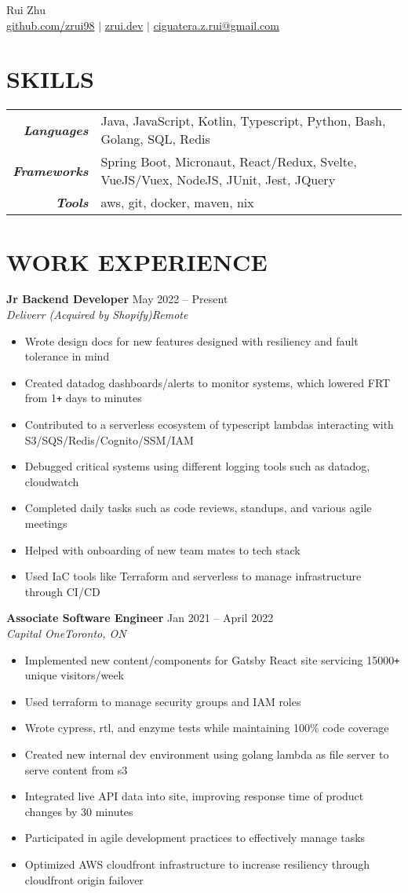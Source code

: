 \documentclass[letterpaper]{article}
\newcommand{\Header}[2]{\begin{center}
	\huge\usefont{OT1}{lmss}{m}{n}
		#1 \\
	\small{#2}
\end{center}}
\newcommand{\SplitEntry}[2]{\textbf{\textit{#1}} & \small{#2}\\}
\newcommand{\NewPart}[1]{\section*{\large\uppercase{\textbf{#1}}}}
\newcommand{\DatedEntry}[5]{\small\textbf{#1}
	\hfill \small{#2}\\
	\textit{#3}\hfill\textit{#4}\\\vspace{0.1cm}
	#5\vspace{0.1cm}
}
\begin{document}
\Header{Rui Zhu}{\href{https://github.com/zrui98}{github.com/zrui98} $|$ \href{https://zrui.dev}{zrui.dev} $|$ \href{mailto:ciguatera.z.rui@gmail.ca}{ciguatera.z.rui@gmail.com}}\vspace{-0.5cm}

\NewPart{Skills}
\begin{tabular}{r|l}
	\SplitEntry{Languages}{Java, JavaScript, Kotlin, Typescript, Python, Bash, Golang, SQL, Redis}
	\SplitEntry{Frameworks}{Spring Boot, Micronaut, React/Redux, Svelte, VueJS/Vuex, NodeJS, JUnit, Jest, JQuery}
	\SplitEntry{Tools}{aws, git, docker, maven, nix}
\end{tabular}\vspace{-0.2cm}

\NewPart{Work Experience}
\DatedEntry{Jr Backend Developer}
{May 2022 -- Present}
{Deliverr (Acquired by Shopify)}
{Remote}
{\begin{itemize}[nolistsep]
	\item Wrote design docs for new features designed with resiliency and fault tolerance in mind
	\item Created datadog dashboards/alerts to monitor systems, which lowered FRT from 1\texttt{+} days to minutes
	\item Contributed to a serverless ecosystem of typescript lambdas interacting with S3/SQS/Redis/Cognito/SSM/IAM
	\item Debugged critical systems using different logging tools such as datadog, cloudwatch
	\item Completed daily tasks such as code reviews, standups, and various agile meetings
	\item Helped with onboarding of new team mates to tech stack
	\item Used IaC tools like Terraform and serverless to manage infrastructure through CI/CD
\end{itemize}}
\DatedEntry{Associate Software Engineer}
{Jan 2021 -- April 2022}
{Capital One}
{Toronto, ON}
{\begin{itemize}[nolistsep]
	\item Implemented new content/components for Gatsby React site servicing 15000\texttt{+} unique visitors/week
	\item Used terraform to manage security groups and IAM roles
	\item Wrote cypress, rtl, and enzyme tests while maintaining 100\% code coverage
	\item Created new internal dev environment using golang lambda as file server to serve content from s3
	\item Integrated live API data into site, improving response time of product changes by 30 minutes
	\item Participated in agile development practices to effectively manage tasks 
	\item Optimized AWS cloudfront infrastructure to increase resiliency through cloudfront origin failover
\end{itemize}}
\end{document}
